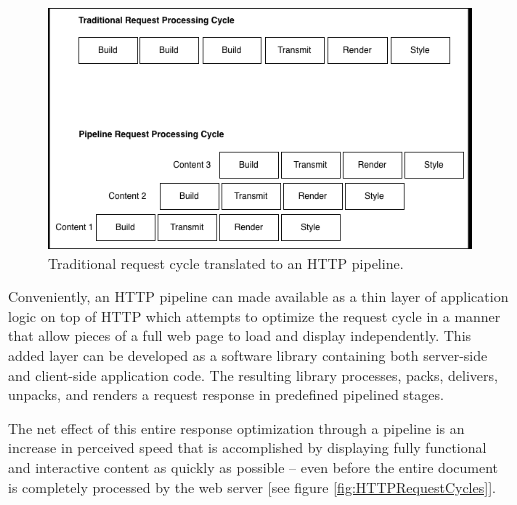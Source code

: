 \documentclass[12pt]{report}
\begin{document}
\begin{figure}[H]
\centering
\includegraphics[width=\textwidth,keepaspectratio]{figures/images/pipeline_request_cycle_linear.png}
\caption{Traditional request cycle translated to an HTTP pipeline.}
\label{fig:traditonalVsPipelineReqestCycle}
\end{figure}

Conveniently, an HTTP pipeline can made available as a thin layer of application logic on top of HTTP which attempts to optimize the request cycle in a manner that allow pieces of a full web page to load and display independently.  This added layer can be developed as a software library containing both server-side and client-side application code. The resulting library processes, packs, delivers, unpacks, and renders a request response in predefined pipelined stages.  

The net effect of this entire response  optimization through a pipeline is an increase in perceived speed that is accomplished by displaying fully functional and interactive content as quickly as possible – even before the entire document is completely processed by the web server [see figure \ref{fig:HTTPRequestCycles}]. 
\end{document}
